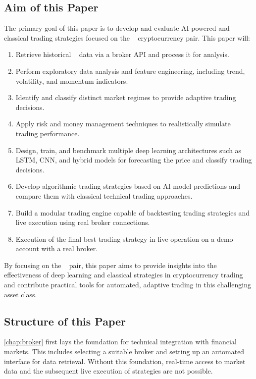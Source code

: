 \subsection{Aim of this Paper}

The primary goal of this paper is to develop and evaluate AI-powered and classical trading strategies focused on the \ethusdc~ cryptocurrency pair.
This paper will:

\begin{enumerate}
    \item Retrieve historical \ethusdc~ data via a broker API and process it for analysis.
    \item Perform exploratory data analysis and feature engineering, including trend, volatility, and momentum indicators.
    \item Identify and classify distinct market regimes to provide adaptive trading decisions.
    \item Apply risk and money management techniques to realistically simulate trading performance.
    \item Design, train, and benchmark multiple deep learning architectures such as LSTM, CNN, and hybrid models for forecasting the price and classify trading decisions.
    \item Develop algorithmic trading strategies based on AI model predictions and compare them with classical technical trading approaches.
    \item Build a modular trading engine capable of backtesting trading strategies and live execution using real broker connections.
    \item Execution of the final best trading strategy in live operation on a demo account with a real broker.
\end{enumerate}

\noindent
By focusing on the \ethusdc~ pair, this paper aims to provide insights into the effectiveness of deep learning and classical strategies in cryptocurrency trading and contribute practical tools for automated, adaptive trading in this challenging asset class.

\subsection{Structure of this Paper}

\autoref{chap:broker} first lays the foundation for technical integration with financial markets.
This includes selecting a suitable broker and setting up an automated interface for data retrieval.
Without this foundation, real-time access to market data and the subsequent live execution of strategies are not possible.

